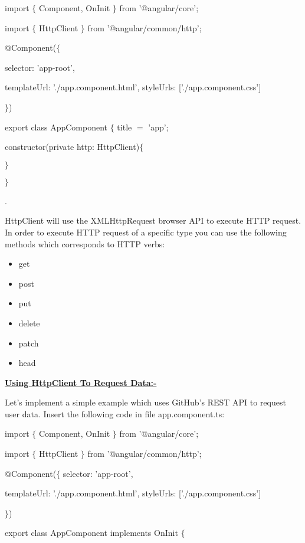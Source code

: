 \documentclass[11pt,twoside]{article}
\begin{document}
\vspace{1\baselineskip}
import $\{$ Component, OnInit $\}$ from '@angular/core'; 

import $\{$ HttpClient $\}$ from '@angular/common/http';

\vspace{1\baselineskip}
@Component($\{$

selector: 'app-root',

templateUrl: './app.component.html', styleUrls: ['./app.component.css']

$\}$)

export class AppComponent $\{$ title $=$ 'app'; 

constructor(private http: HttpClient)$\{$

$\}$

$\}$

\vspace{5\baselineskip}
.

HttpClient will use the XMLHttpRequest browser API to execute HTTP request. In order to execute HTTP request of a specific type you can use the following methods which corresponds to HTTP verbs:

\begin{itemize}
  \item get
  \item post
  \item put
  \item delete
  \item patch
  \item head

\end{itemize}
\vspace{1\baselineskip}
\textbf{\uline{Using HttpClient To Request Data:-}}

\vspace{1\baselineskip}
Let's implement a simple example which uses GitHub's REST API to request user data. Insert the following code in file app.component.ts:

\vspace{1\baselineskip}
import $\{$ Component, OnInit $\}$ from '@angular/core'; 

import $\{$ HttpClient $\}$ from '@angular/common/http';

@Component($\{$ selector: 'app-root',

templateUrl: './app.component.html', styleUrls: ['./app.component.css'] 

$\}$)

export class AppComponent implements OnInit $\{$
\end{document}
